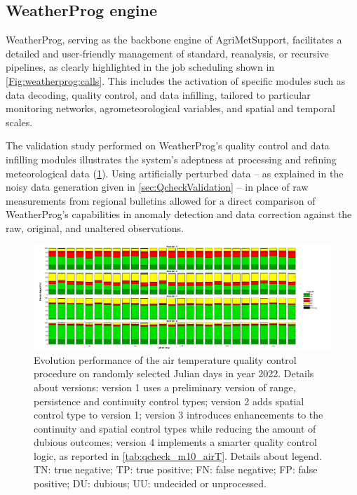 \documentclass[authoryear,preprint,review,12pt]{elsarticle}
\begin{document}
\subsection{WeatherProg engine}
WeatherProg, serving as the backbone engine of AgriMetSupport, facilitates a detailed and user-friendly management of standard, reanalysis, or recursive pipelines, as clearly highlighted in the job scheduling shown in \cref{Fig:weatherprog:calls}.
This includes the activation of specific modules such as data decoding, quality control, and data infilling, tailored to particular monitoring networks, agrometeorological variables, and spatial and temporal scales.

The validation study performed on WeatherProg's quality control and data infilling modules illustrates the system's adeptness at processing and refining meteorological data (\cref{fig:perturbationCharts}).
Using artificially perturbed data -- as explained in the noisy data generation given in \cref{sec:QcheckValidation} -- in place of raw measurements from regional bulletins allowed for a direct comparison of WeatherProg's capabilities in anomaly detection and data correction against the raw, original, and unaltered observations.

\begin{figure}
	\centering
	\includegraphics[scale=.30]{figures/Fig_qck_versions_v2.tif}
	\caption{ Evolution performance of the air temperature quality control procedure on randomly selected Julian days in year 2022.
    Details about versions: version 1 uses a preliminary version of range, persistence and continuity control types; version 2 adds spatial control type to version 1; version 3 introduces enhancements to the continuity and spatial control types while reducing the amount of dubious outcomes; version 4 implements a smarter quality control logic, as reported in \cref{tab:qcheck_m10_airT}.
    Details about legend. TN: true negative; TP: true positive; FN: false negative; FP: false positive; DU: dubious; UU: undecided or unprocessed. }
	\label{fig:perturbationCharts}
\end{figure}
\end{document}
